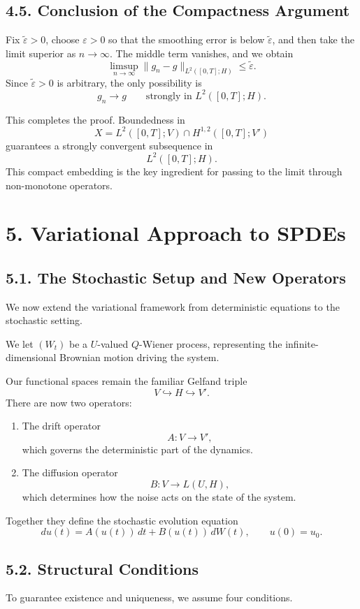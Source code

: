 \documentclass[11pt]{article}
\theoremstyle{definition}
\theoremstyle{remark}
\begin{document}
\subsection*{4.5. Conclusion of the Compactness Argument}
Fix \(\widetilde\varepsilon>0\), choose \(\varepsilon>0\) so that the smoothing error is below \(\widetilde\varepsilon\), and then take the limit superior as \(n\to\infty\). The middle term vanishes, and we obtain
\[
\limsup_{n\to\infty}\|g_n-g\|_{L^2([0,T];H)}
\le
\widetilde\varepsilon.
\]
Since \(\widetilde\varepsilon>0\) is arbitrary, the only possibility is
\[
g_n\to g
\qquad
\text{strongly in } L^2([0,T];H).
\]

This completes the proof. Boundedness in
\[
X=L^2([0,T];V)\cap H^{1,2}([0,T];V')
\]
guarantees a strongly convergent subsequence in
\[
L^2([0,T];H).
\]
This compact embedding is the key ingredient for passing to the limit through non-monotone operators.

\section*{5. Variational Approach to SPDEs}

\subsection*{5.1. The Stochastic Setup and New Operators}
We now extend the variational framework from deterministic equations to the stochastic setting.

We let \((W_t)\) be a \(U\)-valued \(Q\)-Wiener process, representing the infinite-dimensional Brownian motion driving the system.

Our functional spaces remain the familiar Gelfand triple
\[
V\hookrightarrow H\hookrightarrow V'.
\]
There are now two operators:

\begin{enumerate}
\item The drift operator
\[
A:V\to V',
\]
which governs the deterministic part of the dynamics.

\item The diffusion operator
\[
B:V\to L(U,H),
\]
which determines how the noise acts on the state of the system.
\end{enumerate}

Together they define the stochastic evolution equation
\[
du(t)=A(u(t))\,dt+B(u(t))\,dW(t),
\qquad
u(0)=u_0.
\]

\subsection*{5.2. Structural Conditions}
To guarantee existence and uniqueness, we assume four conditions.
\end{document}

